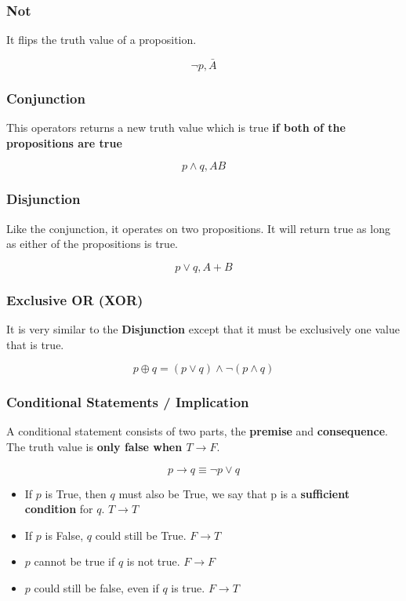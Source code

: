 \documentclass[11pt]{article}
\begin{document}
\subsubsection{Not}
\label{sec:org25f71ea}
It flips the truth value of a proposition.

\[
\neg p, \bar{A}
\]
\subsubsection{Conjunction}
\label{sec:orgb0c9128}
This operators returns a new truth value which is true \textbf{if both of the propositions are true}

\[
p \land q, AB
\]
\subsubsection{Disjunction}
\label{sec:orgb26a39b}
Like the conjunction, it operates on two propositions. It will return true as long as either of the propositions is true.

\[
p \lor q, A+B
\]
\subsubsection{Exclusive OR (XOR)}
\label{sec:org7b77f36}
It is very similar to the \textbf{Disjunction} except that it must be exclusively one value that is true.

\[
p \oplus q = (p \lor q) \land \neg(p \land q)
\]

\subsubsection{Conditional Statements / Implication}
\label{sec:org70f1a83}
A conditional statement consists of two parts, the \textbf{premise} and \textbf{consequence}. The truth value is \textbf{only false when \(T \to F\)}.

\[
p \to q \equiv \neg p \lor q
\]

\begin{itemize}
\item If \(p\) is True, then \(q\) must also be True, we say that p is a \textbf{sufficient condition} for \(q\). \(T \to T\)
\item If \(p\) is False, \(q\) could still be True. \(F \to T\)
\item \(p\) cannot be true if \(q\) is not true. \(F \to F\)
\item \(p\) could still be false, even if \(q\) is true. \(F \to T\)
\end{itemize}
\end{document}
